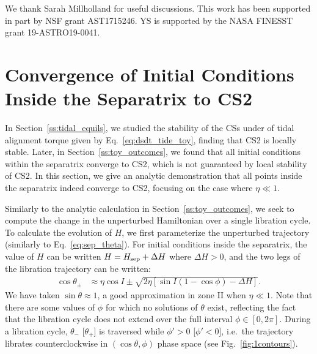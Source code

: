 \documentclass[
        fleqn,
        usenatbib,
    ]{mnras}
\newcommand*{\p}[1]{\left(#1\right)}
\newcommand*{\s}[1]{\left[#1\right]}
\begin{document}
We thank Sarah Millholland for useful discussions. This work has been supported
in part by NSF grant AST1715246. YS is supported by the NASA FINESST grant
19-ASTRO19-0041.%




\appendix

\onecolumn

\section{Convergence of Initial Conditions Inside the Separatrix to CS2
}\label{app:cs_stab2}

In Section~\ref{ss:tidal_equils}, we studied the stability of the CSs under of
tidal alignment torque given by Eq.~\eqref{eq:dsdt_tide_toy}, finding that CS2
is locally stable. Later, in Section~\ref{ss:toy_outcomes}, we found that all
initial conditions within the separatrix converge to CS2, which is not
guaranteed by local stability of CS2. In this section, we give an analytic
demonstration that all points inside the separatrix indeed converge to CS2,
focusing on the case where $\eta \ll 1$.

Similarly to the analytic calculation in Section~\ref{ss:toy_outcomes}, we seek
to compute the change in the unperturbed Hamiltonian over a single libration
cycle. To calculate the evolution of $H$, we first parameterize the unperturbed
trajectory (similarly to Eq.~\ref{eq:sep_theta}). For initial conditions inside
the separatrix, the value of $H$ can be written $H = H_{\rm sep} + \Delta H$
where $\Delta H > 0$, and the two legs of the libration trajectory can be
written:
\begin{align}
    \cos \theta_{\pm} &\approx
        \eta \cos I \pm \sqrt{2\eta\s{\sin I\p{1 - \cos \phi} - \Delta H}}.
        \label{eq:lib_cycle_toy}
\end{align}
We have taken $\sin \theta \approx 1$, a good approximation in zone II when
$\eta \ll 1$. Note that there are some values of $\phi$ for which no solutions
of $\theta$ exist, reflecting the fact that the libration cycle does not extend
over the full interval $\phi \in [0, 2\pi]$. During a libration cycle,
$\theta_-$ [$\theta_+$] is traversed while $\phi' > 0$ [$\phi' < 0$], i.e.\ the
trajectory librates counterclockwise in $(\cos \theta, \phi)$ phase space (see
Fig.~\ref{fig:1contours}).
\end{document}
